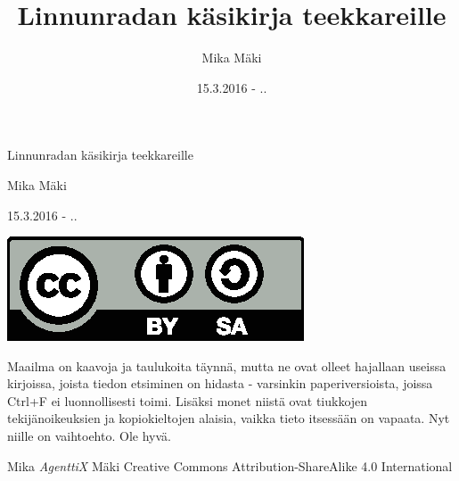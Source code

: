 \documentclass[a4paper,12pt,finnish]{book}
\title{Linnunradan käsikirja teekkareille}
\author{Mika Mäki}
\date{15.3.2016 - \the\day.\the\month.\the\year}
\begin{document}
\begin{titlepage}
\centering
{\huge Linnunradan käsikirja teekkareille \par}
{\large Mika Mäki \par}
{15.3.2016 - \the\day.\the\month.\the\year \par}
\vfill
\includegraphics{by-sa.eps}
\end{titlepage}

Maailma on kaavoja ja taulukoita täynnä, mutta ne ovat olleet hajallaan useissa kirjoissa, joista tiedon etsiminen on hidasta - varsinkin paperiversioista, joissa Ctrl+F ei luonnollisesti toimi. Lisäksi monet niistä ovat tiukkojen tekijänoikeuksien ja kopiokieltojen alaisia, vaikka tieto itsessään on vapaata. Nyt niille on vaihtoehto. Ole hyvä.

Mika \textit{AgenttiX} Mäki
\vfill
Creative Commons Attribution-ShareAlike 4.0 International

\tableofcontents






\end{document}
